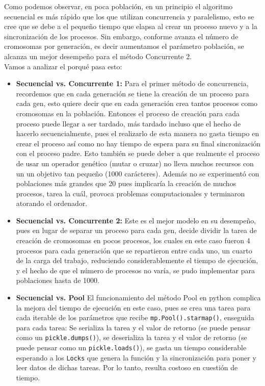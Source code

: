 \documentclass[a4paper,twocolumn,10pt]{article}
\begin{document}
Como podemos observar, en poca población, en un principio el algoritmo secuencial es más rápido que los que utilizan concurrencia y paralelismo, esto se cree que se debe a el pequeño tiempo que elapsa al crear un proceso nuevo y a la sincronización de los procesos. Sin embargo, conforme avanza el número de cromosomas por generación, es decir aumentamos el parámetro población, se alcanza un mejor desempeño para el método Concurrente 2.\\
Vamos a analizar el porqué pasa esto:
\begin{itemize}
    \item \textbf{Secuencial vs. Concurrente 1:} Para el primer método de concurrencia, recordemos que en cada generación se tiene la creación de un proceso para cada gen, esto quiere decir que en cada generación crea tantos procesos como cromosomas en la población. Entonces el proceso de creación para cada proceso puede llegar a ser tardado, más tardado incluso que el hecho de hacerlo secuencialmente, pues el realizarlo de esta manera no gasta tiempo en crear el proceso así como no hay tiempo de espera para su final sincronización con el proceso padre. Esto también se puede deber a que realmente el proceso de usar un operador genético (mutar o cruzar) no lleva muchos recursos con un un objetivo tan pequeño (1000 carácteres). Además no se experimentó con poblaciones más grandes que 20 pues implicaría la creación de muchos procesos, tarea la cuál, provoca problemas computacionales y terminaron atorando el ordenador.
    
    \item \textbf{Secuencial vs. Concurrente 2:} Este es el mejor modelo en su desempeño, pues en lugar de separar un proceso para cada gen, decide dividir la tarea de creación de cromosomas en pocos procesos, los cuales en este caso fueron 4 procesos para cada generación que se repartieron entre cada uno, un cuarto de la carga del trabajo, reduciendo considerablemente el tiempo de ejecución, y el hecho de que el número de procesos no varía, se pudo implementar para poblaciones hasta de 1000.
    
    \item \textbf{Secuencial vs. Pool} El funcionamiento del método Pool en python complica la mejora del tiempo de ejecución en este caso, pues se crea una tarea para cada iterable de los parámetros que recibe \verb|mp.Pool().starmap()|, enseguida para cada tarea: Se serializa la tarea y el valor de retorno (se puede pensar como un \verb|pickle.dumps()|), se deserializa la tarea y el valor de retorno (se puede pensar como un \verb|pickle.loads()|), se gasta un tiempo considerable esperando a los \verb|Locks| que genera la función y la sincronización para poner y leer datos de dichas tareas. Por lo tanto, resulta costoso en cuestión de tiempo.
\end{itemize}
\end{document}
